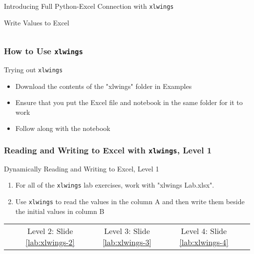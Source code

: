 \documentclass[handout, 11pt]{beamer}
\begin{document}
\begin{section}{Introducing Full Python-Excel Connection with \texttt{xlwings}}
\begin{frame}[fragile]
\begin{block}{Write Values to Excel}
\begin{verbatim}
\end{verbatim}
\end{block}
\end{frame}
\begin{frame}
\frametitle{How to Use \texttt{xlwings}}
{
\begin{block}{Trying out \texttt{xlwings}}
\begin{itemize}
\item Download the contents of the "xlwings" folder in Examples
\item Ensure that you put the Excel file and notebook in the same folder for it to work
\item Follow along with the notebook
\end{itemize}
\end{block}
}
\end{frame}
\begin{frame}
\frametitle{Reading and Writing to Excel with \texttt{xlwings}, Level 1}
{
\begin{block}{Dynamically Reading and Writing to Excel, Level 1}
\begin{enumerate}
\item For all of the
\texttt{xlwings}
lab exercises, work with "xlwings Lab.xlsx".
\item Use
\texttt{xlwings}
to read the values in the column A and then write them beside
the initial values in column B
\end{enumerate}
\vfill
\begin{tabular*}{\textwidth}{@{\extracolsep{\fill}}ccccc}
\toprule
\hfill & Level 2: Slide \textcolor{blue}{\underline{\ref{lab:xlwings-2}}} & Level 3: Slide \textcolor{blue}{\underline{\ref{lab:xlwings-3}}} & Level 4: Slide \textcolor{blue}{\underline{\ref{lab:xlwings-4}}} & \hfill\\

\end{tabular*}
\end{block}
}
\label{lab:xlwings-1}
\end{frame}
\end{section}
\appendix
{}
\setcounter{finalframe}{\value{framenumber}}
\end{document}
